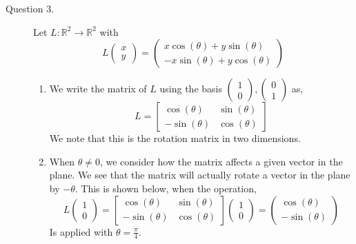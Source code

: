 \documentclass[letterpaper,10pt]{article}
\newcommand{\R}{\mathbb{R}}
\begin{document}
\begin{description}
\item[Question 3.] Let $L: \R^2 \to \R^2$ with
\[L\begin{pmatrix}
x\\y
\end{pmatrix}=\begin{pmatrix}
x\cos(\theta)+y\sin(\theta) \\ -x\sin(\theta)+y\cos(\theta)
\end{pmatrix} \]
\begin{enumerate}[label=\alph*.]
\item We write the matrix of $L$ using the basis $\begin{pmatrix}
1\\0
\end{pmatrix},\begin{pmatrix}
0\\1
\end{pmatrix} $ as,
\[L=\begin{bmatrix}
\cos(\theta) & \sin(\theta)\\
-\sin(\theta) & \cos(\theta)
\end{bmatrix} \]
We note that this is the rotation matrix in two dimensions.
\item When $\theta\neq 0$, we consider how the matrix affects a given vector in the plane. We see that the matrix will actually rotate a vector in the plane by $-\theta$. This is shown below, when the operation,
\[L\begin{pmatrix}
1\\0
\end{pmatrix}=\begin{bmatrix}
\cos(\theta) & \sin(\theta)\\
-\sin(\theta) & \cos(\theta)
\end{bmatrix}\begin{pmatrix}
1\\0
\end{pmatrix}=\begin{pmatrix}
\cos(\theta)\\-\sin(\theta)
\end{pmatrix}\]
Is applied with $\theta=\frac{\pi}{4}$.
\begin{center} 
\end{center}
\end{enumerate}
\end{description}
\end{document}
